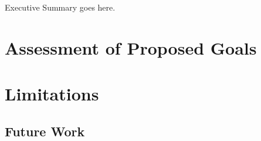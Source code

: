 \begin{executivesummary}
Executive Summary goes here.

\section*{Assessment of Proposed Goals}
\section*{Limitations}
\subsection*{Future Work}
\end{executivesummary}